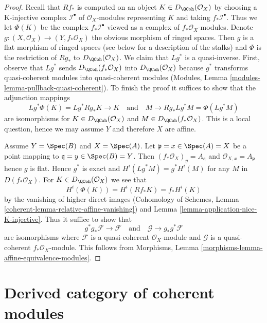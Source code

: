 \begin{proof}
Recall that $Rf_*$ is computed on an object $K \in D_\QCoh(\mathcal{O}_X)$
by choosing a K-injective complex $\mathcal{I}^\bullet$ of
$\mathcal{O}_X$-modules representing $K$ and taking $f_*\mathcal{I}^\bullet$.
Thus we let $\Phi(K)$ be the complex $f_*\mathcal{I}^\bullet$
viewed as a complex of $f_*\mathcal{O}_X$-modules.
Denote $g : (X, \mathcal{O}_X) \to (Y, f_*\mathcal{O}_X)$ the
obvious morphism of ringed spaces. Then $g$ is a flat morphism of
ringed spaces (see below for a description of the stalks) and
$\Phi$ is the restriction of $Rg_*$ to $D_\QCoh(\mathcal{O}_X)$.
We claim that $Lg^*$ is a quasi-inverse. First, observe that
$Lg^*$ sends $D_\QCoh(f_*\mathcal{O}_X)$ into $D_\QCoh(\mathcal{O}_X)$
because $g^*$ transforms quasi-coherent modules into quasi-coherent
modules (Modules, Lemma \ref{modules-lemma-pullback-quasi-coherent}).
To finish the proof it suffices to show that
the adjunction mappings
$$
Lg^*\Phi(K) = Lg^*Rg_*K \to K
\quad\text{and}\quad
M \to Rg_*Lg^*M = \Phi(Lg^*M)
$$
are isomorphisms for $K \in D_\QCoh(\mathcal{O}_X)$ and
$M \in D_\QCoh(f_*\mathcal{O}_X)$. This is a local question, hence
we may assume $Y$ and therefore $X$ are affine.

\medskip\noindent
Assume $Y = \Spec(B)$ and $X = \Spec(A)$. Let
$\mathfrak p = x \in \Spec(A) = X$ be a point mapping to
$\mathfrak q = y \in \Spec(B) = Y$. Then
$(f_*\mathcal{O}_X)_y = A_\mathfrak q$ and $\mathcal{O}_{X, x} = A_\mathfrak p$
hence $g$ is flat. Hence $g^*$ is exact and $H^i(Lg^*M) = g^*H^i(M)$
for any $M$ in $D(f_*\mathcal{O}_X)$.
For $K \in D_\QCoh(\mathcal{O}_X)$ we see that
$$
H^i(\Phi(K)) = H^i(Rf_*K) = f_*H^i(K)
$$
by the vanishing of higher direct images
(Cohomology of Schemes, Lemma \ref{coherent-lemma-relative-affine-vanishing})
and Lemma \ref{lemma-application-nice-K-injective}.
Thus it suffice to show that
$$
g^*g_*\mathcal{F} \to \mathcal{F}
\quad\text{and}\quad
\mathcal{G} \to g_*g^*\mathcal{F}
$$
are isomorphisms where $\mathcal{F}$ is
a quasi-coherent $\mathcal{O}_X$-module and $\mathcal{G}$ is
a quasi-coherent $f_*\mathcal{O}_X$-module. This follows from
Morphisms, Lemma \ref{morphisms-lemma-affine-equivalence-modules}.
\end{proof}





\section{Derived category of coherent modules}
\label{section-derived-coherent}

